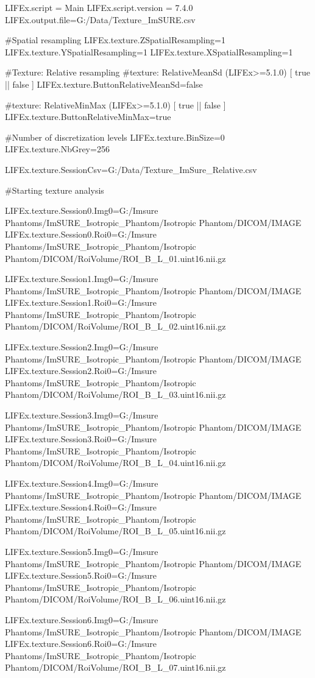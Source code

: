 LIFEx.script = Main
LIFEx.script.version = 7.4.0
LIFEx.output.file=G:/Data/Texture_ImSURE.csv

#Spatial resampling
LIFEx.texture.ZSpatialResampling=1
LIFEx.texture.YSpatialResampling=1
LIFEx.texture.XSpatialResampling=1

#Texture: Relative resampling
#texture: RelativeMeanSd (LIFEx>=5.1.0) [ true || false ]
LIFEx.texture.ButtonRelativeMeanSd=false 

#texture: RelativeMinMax (LIFEx>=5.1.0) [ true || false ]
LIFEx.texture.ButtonRelativeMinMax=true

#Number of discretization levels
LIFEx.texture.BinSize=0
LIFEx.texture.NbGrey=256

LIFEx.texture.SessionCsv=G:/Data/Texture_ImSure_Relative.csv


#Starting texture analysis

LIFEx.texture.Session0.Img0=G:/Imsure Phantoms/ImSURE_Isotropic_Phantom/Isotropic Phantom/DICOM/IMAGE
LIFEx.texture.Session0.Roi0=G:/Imsure Phantoms/ImSURE_Isotropic_Phantom/Isotropic Phantom/DICOM/RoiVolume/ROI_B_L_01.uint16.nii.gz

LIFEx.texture.Session1.Img0=G:/Imsure Phantoms/ImSURE_Isotropic_Phantom/Isotropic Phantom/DICOM/IMAGE
LIFEx.texture.Session1.Roi0=G:/Imsure Phantoms/ImSURE_Isotropic_Phantom/Isotropic Phantom/DICOM/RoiVolume/ROI_B_L_02.uint16.nii.gz

LIFEx.texture.Session2.Img0=G:/Imsure Phantoms/ImSURE_Isotropic_Phantom/Isotropic Phantom/DICOM/IMAGE
LIFEx.texture.Session2.Roi0=G:/Imsure Phantoms/ImSURE_Isotropic_Phantom/Isotropic Phantom/DICOM/RoiVolume/ROI_B_L_03.uint16.nii.gz

LIFEx.texture.Session3.Img0=G:/Imsure Phantoms/ImSURE_Isotropic_Phantom/Isotropic Phantom/DICOM/IMAGE
LIFEx.texture.Session3.Roi0=G:/Imsure Phantoms/ImSURE_Isotropic_Phantom/Isotropic Phantom/DICOM/RoiVolume/ROI_B_L_04.uint16.nii.gz

LIFEx.texture.Session4.Img0=G:/Imsure Phantoms/ImSURE_Isotropic_Phantom/Isotropic Phantom/DICOM/IMAGE
LIFEx.texture.Session4.Roi0=G:/Imsure Phantoms/ImSURE_Isotropic_Phantom/Isotropic Phantom/DICOM/RoiVolume/ROI_B_L_05.uint16.nii.gz

LIFEx.texture.Session5.Img0=G:/Imsure Phantoms/ImSURE_Isotropic_Phantom/Isotropic Phantom/DICOM/IMAGE
LIFEx.texture.Session5.Roi0=G:/Imsure Phantoms/ImSURE_Isotropic_Phantom/Isotropic Phantom/DICOM/RoiVolume/ROI_B_L_06.uint16.nii.gz

LIFEx.texture.Session6.Img0=G:/Imsure Phantoms/ImSURE_Isotropic_Phantom/Isotropic Phantom/DICOM/IMAGE
LIFEx.texture.Session6.Roi0=G:/Imsure Phantoms/ImSURE_Isotropic_Phantom/Isotropic Phantom/DICOM/RoiVolume/ROI_B_L_07.uint16.nii.gz

